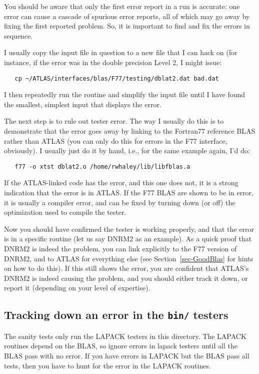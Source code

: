 \documentclass[11pt]{article}
\begin{document}
You should be aware that only the first error report in a run is accurate:
one error can cause a cascade of spurious error reports, all of which may go
away by fixing the first reported problem.  So, it is important to find and
fix the errors in sequence.

I usually copy the input file in question to a new file that
I can hack on (for instance, if the error was in the double precision Level 2,
I might issue:
\begin{verbatim}
   cp ~/ATLAS/interfaces/blas/F77/testing/dblat2.dat bad.dat
\end{verbatim}
I then repeatedly run the
routine and simplify the input file until I have found the smallest, simplest
input that displays the error.

The next step is to rule out tester error.  The way I usually
do this is to demonstrate that the error goes away by linking to the Fortran77
reference BLAS rather than ATLAS (you can only do this for errors in the
F77 interface, obviously).  I usually just do it by hand, i.e., for the
same example again, I'd do:
\begin{verbatim}
   f77 -o xtst dblat2.o /home/rwhaley/lib/libfblas.a
\end{verbatim}
If the ATLAS-linked code has the error, and this one does not, it is a
strong indication that the error is in ATLAS.  If the F77 BLAS are shown
to be in error, it is usually a compiler error, and can be fixed by turning
down (or off) the optimization used to compile the tester.

Now you should have confirmed the tester is working properly, and that
the error is in a specific routine (let us say DNRM2 as an example).
As a quick proof that DNRM2 is indeed the problem, you can link explicitly
to the F77 version of DNRM2, and to ATLAS for everything else (see
Section~\ref{sec-GoodBlas} for hints on how to do this).  If this
still shows the error, you are confident that ATLAS's DNRM2 is indeed causing 
the problem, and you should either track it down, or report it (depending on
your level of expertise).

\subsection{Tracking down an error in the {\tt bin/} testers}
\label{sec-LapackDebug}

The sanity tests only run the LAPACK testers in this directory.  The LAPACK
routines depend on the BLAS, so ignore errors in lapack testers until all
the BLAS pass with no error.  If you have errors in LAPACK but the BLAS pass
all tests, then you have to hunt for the error in the LAPACK routines.
\end{document}
